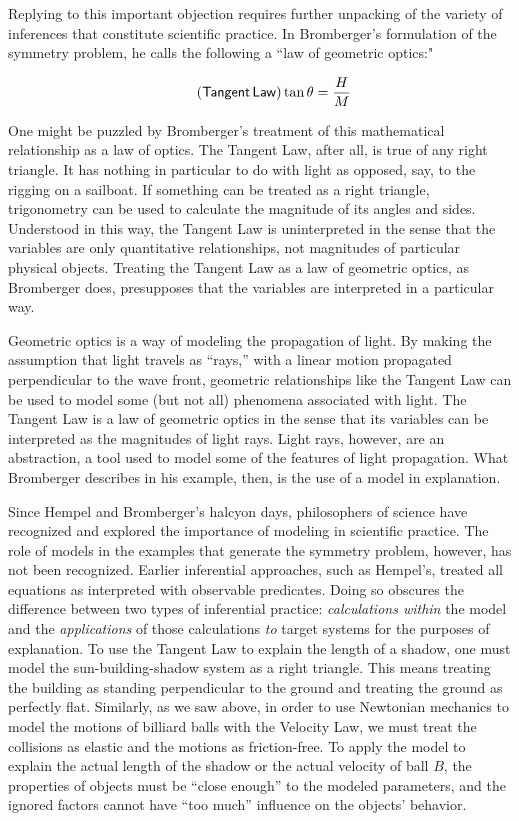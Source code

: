 \documentclass{article}                     %
\begin{document}
Replying to this important objection requires further unpacking of the variety of inferences that constitute scientific practice. In Bromberger's formulation of the symmetry problem, he calls the following a ``law of geometric optics:"

\begin{equation}
	\label{eq:tangent_law}
	\tag{$ \mathsf{Tangent\,Law} $}
	\tan \theta  = \frac{H}{M}
\end{equation}

\noindent One might be puzzled by Bromberger's treatment of this mathematical relationship as a law of optics.  The Tangent Law, after all, is true of any right triangle.  It has nothing in particular to do with light as opposed, say, to the rigging on a sailboat.  If something can be treated as a right triangle, trigonometry can be used to calculate the magnitude of its angles and sides.  Understood in this way, the Tangent Law is uninterpreted in the sense that the variables are only quantitative relationships, not magnitudes of particular physical objects.  Treating the Tangent Law as a law of geometric optics, as Bromberger does, presupposes that the variables are interpreted in a particular way.

Geometric optics is a way of modeling the propagation of light.  By making the assumption that light travels as ``rays,'' with a linear motion propagated perpendicular to the wave front, geometric relationships like the Tangent Law can be used to model some (but not all) phenomena associated with light.  The Tangent Law is a law of geometric optics in the sense that its variables can be interpreted as the magnitudes of light rays.  Light rays, however, are an abstraction, a tool used to model some of the features of light propagation.  What Bromberger describes in his example, then, is the use of a model in explanation. 

Since Hempel and Bromberger's halcyon days, philosophers of science have recognized and explored the importance of modeling in scientific practice.  The role of models in the examples that generate the symmetry problem, however, has not been recognized.  Earlier inferential approaches, such as Hempel's, treated all equations as interpreted with observable predicates. Doing so obscures the difference between two types of inferential practice: \textit{calculations within} the model and the \textit{applications} of those calculations \textit{to} target systems for the purposes of explanation. To use the Tangent Law to explain the length of a shadow, one must model the sun-building-shadow system as a right triangle.  This means treating the building as standing perpendicular to the ground and treating the ground as perfectly flat.  Similarly, as we saw above, in order to use Newtonian mechanics to model the motions of billiard balls with the Velocity Law, we must treat the collisions as elastic and the motions as friction-free. To apply the model to explain the actual length of the shadow or the actual velocity of ball $B$, the properties of objects must be ``close enough'' to the modeled parameters, and the ignored factors cannot have ``too much'' influence on the objects' behavior. 
\end{document}
